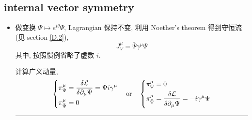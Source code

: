 \subsection{internal vector symmetry}
\begin{itemize}
	\item 做变换 $\Psi \mapsto e^{i \theta} \Psi$, Lagrangian 保持不变, 利用 Noether's theorem 得到守恒流 (见 section \ref{D.2}),
	\begin{equation} \label{7.3.3}
		J_V^\mu = \bar{\Psi} \gamma^\mu \Psi
	\end{equation}
	其中, 按照惯例省略了虚数 $i$.
	
	\begin{tcolorbox}[title=calculation:]
		计算广义动量,
		\begin{equation}
			\begin{dcases}
				\pi_\Psi^\mu = \frac{\delta \mathcal{L}}{\delta \partial_\mu \Psi} = \bar{\Psi} i \gamma^\mu \\
				\pi_{\bar{\Psi}}^\mu = 0
			\end{dcases} \quad \text{or} \quad \begin{dcases}
				\pi_\Psi^\mu = 0 \\
				\pi_{\bar{\Psi}}^\mu = \frac{\delta \mathcal{L}}{\delta \partial_\mu \bar{\Psi}} = - i \gamma^\mu \Psi
			\end{dcases}
		\end{equation}
		
		\noindent\rule[0.5ex]{\linewidth}{0.5pt} %
		

\end{tcolorbox}
\end{itemize}
